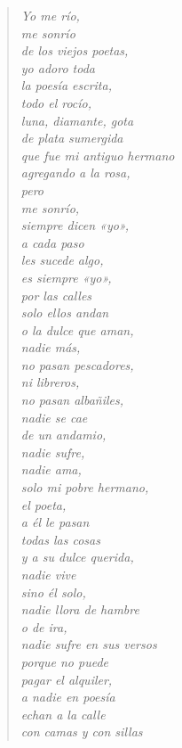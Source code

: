 \documentclass[12pt]{article}
\begin{document}
\clearpage
{}
\begin{verse}

\emph{Yo me río,\\
me sonrío\\
de los viejos poetas,\\
yo adoro toda\\
la poesía escrita,\\
todo el rocío,\\
luna, diamante, gota\\
de plata sumergida\\
que fue mi antiguo hermano\\
agregando a la rosa,\\
pero\\
me sonrío,\\
siempre dicen «yo»,\\
a cada paso\\
les sucede algo,\\
es siempre «yo»,\\
por las calles\\
solo ellos andan\\
o la dulce que aman,\\
nadie más,\\
no pasan pescadores,\\
ni libreros,\\
no pasan albañiles,\\
nadie se cae\\
de un andamio,\\
nadie sufre,\\
nadie ama,\\
solo mi pobre hermano,\\
el poeta,\\
a él le pasan\\
todas las cosas\\
y a su dulce querida,\\
nadie vive\\
sino él solo,\\
nadie llora de hambre\\
o de ira,\\
nadie sufre en sus versos\\
porque no puede\\
pagar el alquiler,\\
a nadie en poesía\\
echan a la calle\\
con camas y con sillas\\
}
\end{verse}
\end{document}
